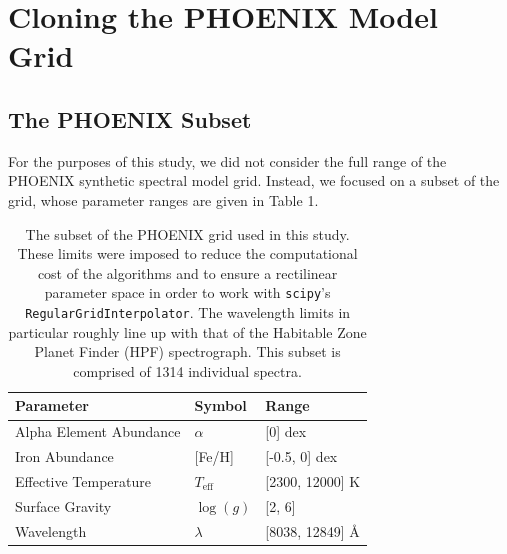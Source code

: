 \documentclass[twocolumn]{aastex631}
\begin{document}
\section{Cloning the PHOENIX Model Grid}
\subsection{The PHOENIX Subset}
For the purposes of this study, we did not consider the full range of the
PHOENIX synthetic spectral model grid. Instead, we focused on a subset of 
the grid, whose parameter ranges are given in Table 1.

\begin{table}[h!]
    \centering
    \begin{tabular}{lll}
        \hline
        \bf{Parameter} & \bf{Symbol} & \bf{Range}\\
        \hline
        Alpha Element Abundance & $\alpha$ & [0] dex\\
        Iron Abundance & [Fe/H] & [-0.5, 0] dex\\
        Effective Temperature & $T_{\mathrm{eff}}$ & [2300, 12000] K\\
        Surface Gravity & $\log(g)$ & [2, 6]\\
        Wavelength & $\lambda$ & [8038, 12849] \AA\\
        \hline
    \end{tabular}
    \caption{The subset of the PHOENIX grid used in this study. These limits 
    were imposed to reduce the computational cost of the algorithms and to 
    ensure a rectilinear parameter space in order to work with \texttt{scipy}'s
    \texttt{RegularGridInterpolator}. The wavelength limits in particular 
    roughly line up with that of the Habitable Zone Planet Finder (HPF) 
    spectrograph. This subset is comprised of 1314 individual spectra.}
\end{table}
\end{document}
